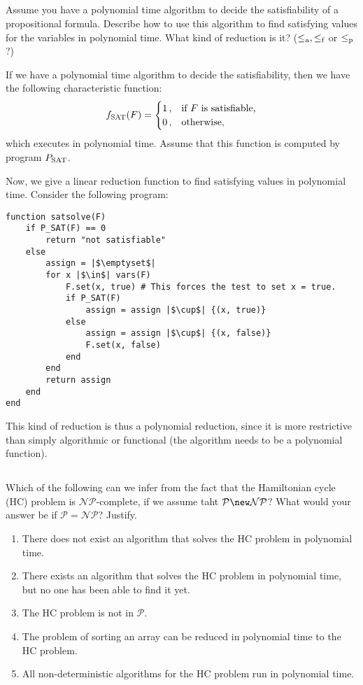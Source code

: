\subsection{} %
Assume you have a polynomial time algorithm to decide
the satisfiability of a propositional formula.
Describe how to use this algorithm to find satisfying values for the variables
in polynomial time.
What kind of reduction is it?
(\(\le_\textnormal{a}, \le_\textnormal{f}\) or \(\le_\textnormal{p}\)?)

\begin{solution}
	If we have a polynomial time algorithm to decide the satisfiability,
	then we have the following characteristic function:
	\[
	f_{\textnormal{SAT}}(F) = \begin{cases} 1\,, & \textnormal{if } F \textnormal{ is satisfiable,}\\
	0\,, & \textnormal{otherwise,}
	\end{cases}
	\]
	which executes in polynomial time.
	Assume that this function is computed by program \(P_\textnormal{SAT}\).

	Now, we give a linear reduction function to find satisfying values
	in polynomial time.
	Consider the following program:
\begin{verbatim}
function satsolve(F)
	if P_SAT(F) == 0
		return "not satisfiable"
	else
		assign = |$\emptyset$|
		for x |$\in$| vars(F)
			F.set(x, true) # This forces the test to set x = true.
			if P_SAT(F)
				assign = assign |$\cup$| {(x, true)}
			else
				assign = assign |$\cup$| {(x, false)}
				F.set(x, false)
			end
		end
		return assign
	end
end
\end{verbatim}
	This kind of reduction is thus a polynomial reduction,
	since it is more restrictive than simply algorithmic or functional
	(the algorithm needs to be a polynomial function).
\end{solution}

\subsection{} %
Which of the following can we infer
from the fact that the Hamiltonian cycle (HC) problem
is \(\mathcal{NP}\)-complete,
if we assume taht \(\mathcal{P} \new \mathcal{NP}\)?
What would your answer be if \(\mathcal{P} = \mathcal{NP}\)?
Justify.
\begin{enumerate}
	\item There does not exist an algorithm
	that solves the HC problem in polynomial time.
	\item There exists an algorithm that solves the HC problem
	in polynomial time, but no one has been able to find it yet.
	\item The HC problem is not in \(\mathcal{P}\).
	\item The problem of sorting an array can be reduced
	in polynomial time to the HC problem.
	\item All non-deterministic algorithms for the HC problem
	run in polynomial time.
\end{enumerate}

